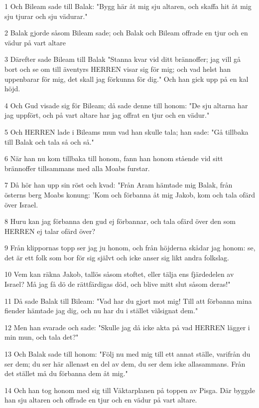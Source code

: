 \par 1 Och Bileam sade till Balak: "Bygg här åt mig sju altaren, och skaffa hit åt mig sju tjurar och sju vädurar."
\par 2 Balak gjorde såsom Bileam sade; och Balak och Bileam offrade en tjur och en vädur på vart altare
\par 3 Därefter sade Bileam till Balak "Stanna kvar vid ditt brännoffer; jag vill gå bort och se om till äventyrs HERREN visar sig för mig; och vad helst han uppenbarar för mig, det skall jag förkunna för dig." Och han gick upp på en kal höjd.
\par 4 Och Gud visade sig för Bileam; då sade denne till honom: "De sju altarna har jag uppfört, och på vart altare har jag offrat en tjur och en vädur."
\par 5 Och HERREN lade i Bileams mun vad han skulle tala; han sade: "Gå tillbaka till Balak och tala så och så."
\par 6 När han nu kom tillbaka till honom, fann han honom stående vid sitt brännoffer tillsammans med alla Moabs furstar.
\par 7 Då hör han upp sin röst och kvad: "Från Aram hämtade mig Balak, från österns berg Moabs konung: 'Kom och förbanna åt mig Jakob, kom och tala ofärd över Israel.
\par 8 Huru kan jag förbanna den gud ej förbannar, och tala ofärd över den som HERREN ej talar ofärd över?
\par 9 Från klippornas topp ser jag ju honom, och från höjderna skådar jag honom: se, det är ett folk som bor för sig självt och icke anser sig likt andra folkslag.
\par 10 Vem kan räkna Jakob, tallös såsom stoftet, eller tälja ens fjärdedelen av Israel? Må jag få dö de rättfärdigas död, och blive mitt slut såsom deras!"
\par 11 Då sade Balak till Bileam: "Vad har du gjort mot mig! Till att förbanna mina fiender hämtade jag dig, och nu har du i stället välsignat dem."
\par 12 Men han svarade och sade: "Skulle jag då icke akta på vad HERREN lägger i min mun, och tala det?"
\par 13 Och Balak sade till honom: "Följ nu med mig till ett annat ställe, varifrån du ser dem; du ser här allenast en del av dem, du ser dem icke allasammans. Från det stället må du förbanna dem åt mig."
\par 14 Och han tog honom med sig till Väktarplanen på toppen av Pisga. Där byggde han sju altaren och offrade en tjur och en vädur på vart altare.

